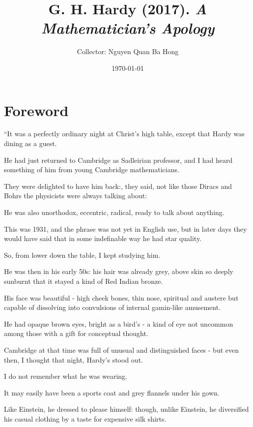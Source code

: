 \documentclass{article}
\title{G. H. Hardy (2017). \textit{A Mathematician's Apology}}
\author{Collector: Nguyen Quan Ba Hong}
\date{\today}
\numberwithin{equation}{section}
\begin{document}
\maketitle
\setcounter{secnumdepth}{6}
\setcounter{tocdepth}{6}


\section*{Foreword}
``It was a perfectly ordinary night at Christ's high table, except that Hardy was dining as a guest.

He had just returned to Cambridge as Sadleirian professor, and I had heard something of him from young Cambridge mathematicians.

They were delighted to have him back:, they said, not like those Diracs and Bohrs the physicists were always talking about: 

He was also unorthodox, eccentric, radical, ready to talk about anything.

This was 1931, and the phrase was not yet in English use, but in later days they would have said that in some indefinable way he had star quality.

%
So, from lower down the table, I kept studying him.

He was then in his early 50s: his hair was already grey, above skin so deeply sunburnt that it stayed a kind of Red Indian bronze.

His face was beautiful - high cheek bones, thin nose, spiritual and austere but capable of dissolving into convulsions of internal gamin-like amusement.

He had opaque brown eyes, bright as a bird's - a kind of eye not uncommon among those with a gift for conceptual thought.

Cambridge at that time was full of unusual and distinguished faces - but even then, I thought that night, Hardy's stood out.

%
I do not remember what he was wearing.

It may easily have been a sports coat and grey flannels under his gown.

Like Einstein, he dressed to please himself: though, unlike Einstein, he diversified his casual clothing by a taste for expensive silk shirts.
\end{document}

